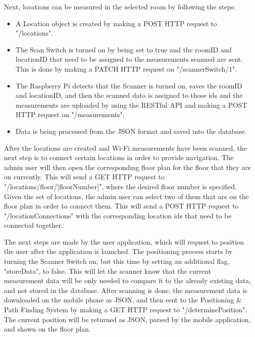 Next, locations can be measured in the selected room by following the steps:
\begin{itemize}
    \item A Location object is created by making a POST HTTP request to "/locations".
    \item The Scan Switch is turned on by being set to true and the roomID and locationID that need to be assigned to the measurements scanned are sent. This is done by making a PATCH HTTP request on "/scannerSwitch/1".
    \item The Raspberry Pi detects that the Scanner is turned on, saves the roomID and locationID, and then the scanned data is assigned to those ids and the measurements are uploaded by using the RESTful API and making a POST HTTP request on "/measurements".
    \item Data is being processed from the JSON format and saved into the database.
\end{itemize}

After the locations are created and Wi-Fi measurements have been scanned, the next step is to connect certain locations in order to provide navigation. The admin user will then open the corresponding floor plan for the floor that they are on currently. This will send a GET HTTP request to "/locations/floor/[floorNumber]", where the desired floor number is specified. Given the set of locations, the admin user can select two of them that are on the floor plan in order to connect them. This will send a POST HTTP request to "/locationConnections" with the corresponding location ids that need to be connected together. 

The next steps are made by the user application, which will request to position the user after the application is launched. The positioning process starts by turning the Scanner Switch on, but this time by setting an additional flag, "storeData", to false. This will let the scanner know that the current measurement data will be only needed to compare it to the already existing data, and not stored in the database. After scanning is done, the measurement data is downloaded on the mobile phone as JSON, and then sent to the Positioning \& Path Finding System by making a GET HTTP request to "/determinePosition". The current position will be returned as JSON, parsed by the mobile application, and shown on the floor plan.

